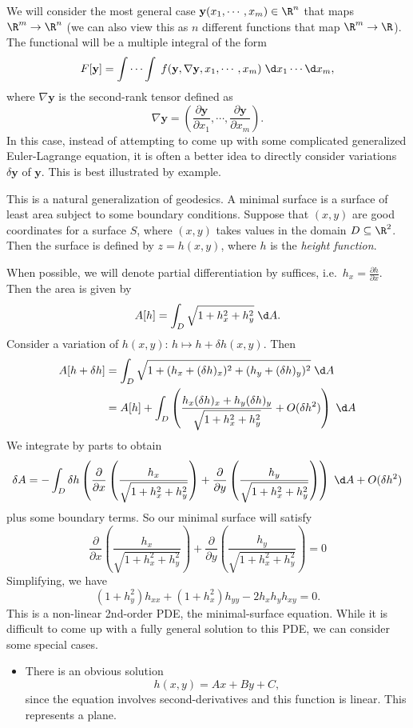 \documentclass[a4paper]{article}
\begin{document}
We will consider the most general case $\mathbf{y}(x_1, \cdots, x_m) \in \R^n$ that maps $\R^m \to \R^n$ (we can also view this as $n$ different functions that map $\R^m \to \R$). The functional will be a multiple integral of the form
\[
  F[\mathbf{y}] = \int\cdots \int \; f(\mathbf{y}, \nabla \mathbf{y}, x_1, \cdots, x_m)\;\d x_1\cdots \d x_m,
\]
where $\nabla \mathbf{y}$ is the second-rank tensor defined as
\[
  \nabla \mathbf{y} = \left(\frac{\partial \mathbf{y}}{\partial x_1}, \cdots, \frac{\partial \mathbf{y}}{\partial x_m}\right).
\]
In this case, instead of attempting to come up with some complicated generalized Euler-Lagrange equation, it is often a better idea to directly consider variations $\delta \mathbf{y}$ of $\mathbf{y}$. This is best illustrated by example.

\begin{eg}
  This is a natural generalization of geodesics. A minimal surface is a surface of least area subject to some boundary conditions. Suppose that $(x, y)$ are good coordinates for a surface $S$, where $(x, y)$ takes values in the domain $D \subseteq \R^2$. Then the surface is defined by $z = h(x, y)$, where $h$ is the \emph{height function}.

  When possible, we will denote partial differentiation by suffices, i.e.\ $h_x = \frac{\partial h}{\partial x}$. Then the area is given by
  \[
    A[h] = \int_D \sqrt{1 + h_x^2 + h_y^2}\;\d A.
  \]
  Consider a variation of $h(x, y)$: $h\mapsto h + \delta h(x, y)$. Then
  \begin{align*}
    A[h + \delta h] &= \int_D \sqrt{1 + (h_x + (\delta h)_x)^2 + (h_y + (\delta h)_y)^2}\;\d A\\
    &= A[h] + \int_D \left(\frac{h_x (\delta h)_x + h_y (\delta h)_y}{\sqrt{1 + h_x^2 + h_y^2}} + O(\delta h^2)\right)\;\d A
  \end{align*}
  We integrate by parts to obtain
  \[
    \delta A = -\int_D \delta h\left(\frac{\partial}{\partial x} \left(\frac{h_x}{\sqrt{1 + h_x^2 + h_y^2}}\right) + \frac{\partial}{\partial y} \left(\frac{h_y}{\sqrt{1 + h_x^2 + h_y^2}}\right)\right)\;\d A + O(\delta h^2)
  \]
  plus some boundary terms. So our minimal surface will satisfy
  \[
    \frac{\partial}{\partial x} \left(\frac{h_x}{\sqrt{1 + h_x^2 + h_y^2}}\right) + \frac{\partial}{\partial y} \left(\frac{h_y}{\sqrt{1 + h_x^2 + h_y^2}}\right) = 0
  \]
  Simplifying, we have
  \[
    (1 + h_y^2)h_{xx} + (1 + h_x^2) h_{yy} - 2h_xh_y h_{xy} = 0.
  \]
  This is a non-linear 2nd-order PDE, the minimal-surface equation. While it is difficult to come up with a fully general solution to this PDE, we can consider some special cases.
  \begin{itemize}
    \item There is an obvious solution
      \[
        h(x, y) = Ax + By + C,
      \]
      since the equation involves second-derivatives and this function is linear. This represents a plane.


\end{itemize}
\end{eg}
\end{document}
